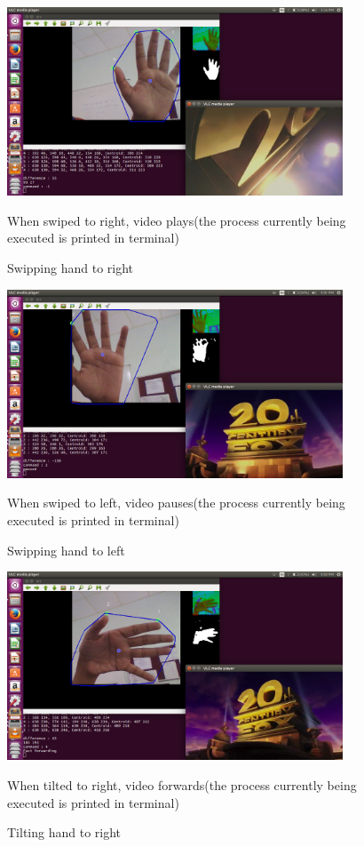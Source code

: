 \documentclass[a4paper,11pt]{article}
\begin{document}
		\begin{figure}[!ht]
			\begin{centering}
				\includegraphics[width=10cm]{images/play.png}\\
						\caption{Swipping hand to right}
						When swiped to right, video plays(the process  currently being executed is printed in terminal)
			\end{centering}
		\end{figure}

		\begin{figure}[!ht]
			\begin{centering}
				\includegraphics[width=10cm]{images/pause.png}\\
						\caption{Swipping hand to left}
						When swiped to left, video pauses(the process currently being executed is printed in terminal)
			\end{centering}
		\end{figure}
		\newpage
		\begin{figure}[!ht]
			\begin{centering}
				\includegraphics[width=10cm]{images/fwd.png}\\
						\caption{Tilting hand to right}
						When tilted to right, video forwards(the process currently being executed is printed in terminal)
			\end{centering}
		\end{figure}
		
\end{document}
